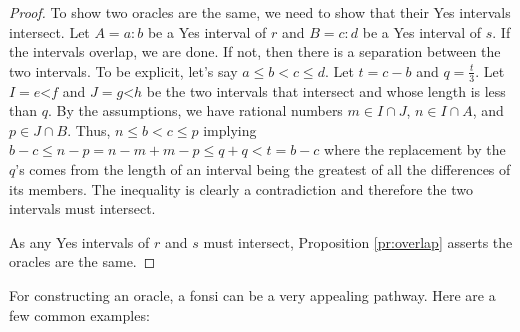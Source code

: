 \documentclass[12pt]{article}
\theoremstyle{remark}
\newcommand{\lt}{\mathord{<}}
\begin{document}
\begin{proof}
To show two oracles are the same, we need to show that their Yes intervals intersect. Let $A=a:b$ be a Yes interval of $r$ and $B=c:d$ be a Yes interval of $s$. If the intervals overlap, we are done. If not, then there is a separation between the two intervals. To be explicit, let's say $a \leq b < c \leq d$. Let $t = c-b$ and $q = \frac{t}{3}$. Let $I= e\lt f$ and $J= g \lt h$ be the two intervals that intersect and whose length is less than $q$. By the assumptions, we have rational numbers $m \in I \cap J$, $n \in I \cap A$, and $p \in J \cap B$. Thus,  $n \leq b < c \leq p$ implying $b -c \leq n - p  = n-m + m-p \leq q + q < t = b-c$ where the replacement by the $q$'s comes from the length of an interval being the greatest of all the differences of its members. The inequality is clearly a contradiction and therefore the two intervals must intersect. 
 
As any Yes intervals of $r$ and $s$ must intersect, Proposition \ref{pr:overlap} asserts the oracles are the same.  
\end{proof}

For constructing an oracle, a fonsi can be a very appealing pathway. Here are a few common examples: 
\end{document}
